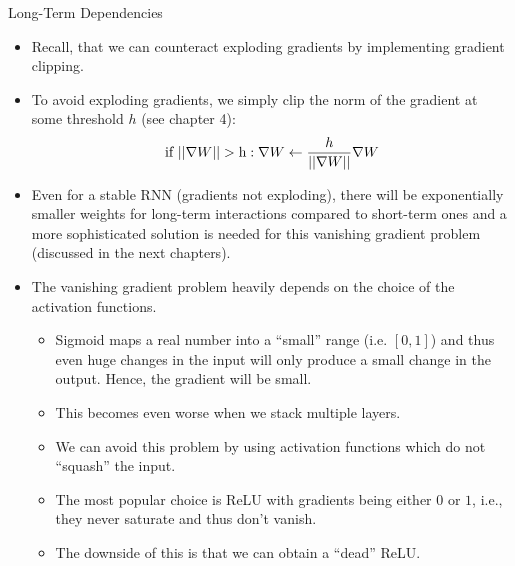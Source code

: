 \begin{vbframe}{Long-Term Dependencies}
  \begin{itemize}
    \item Recall, that we can counteract exploding gradients by implementing gradient clipping.
    \item To avoid exploding gradients, we simply clip the norm of the gradient at some threshold $h$ (see chapter 4): $$\text{if  } ||\nabla W|| > \text h: \nabla W \leftarrow \frac{h}{||\nabla W||} \nabla W $$
  \end{itemize}

  \begin{itemize}
    \item Even for a stable RNN (gradients not exploding), there will be exponentially smaller weights for long-term interactions compared to short-term ones and a more sophisticated solution is needed for this vanishing gradient problem (discussed in the next chapters).
    \item The {vanishing gradient problem} heavily depends on the choice of the activation functions.
    \begin{itemize} 
      \item Sigmoid maps a real number into a \enquote{small} range (i.e. $[0, 1]$) and thus even huge changes in the input will only produce a small change in the output. Hence, the gradient will be small.
      \item This becomes even worse when we stack multiple layers.
      \item We can avoid this problem by using activation functions which do not \enquote{squash} the input.
      \item The most popular choice is ReLU with gradients being either $0$ or $1$, i.e., they never saturate and thus don't vanish.
      \item The downside of this is that we can obtain a \enquote{dead} ReLU.
    \end{itemize}

  \end{itemize}


\end{vbframe}

\endlecture

